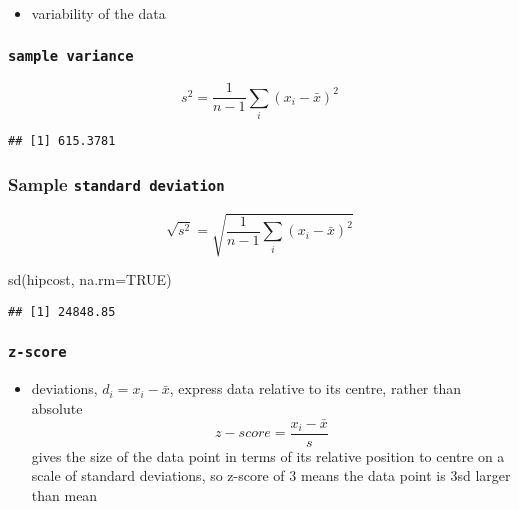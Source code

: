 \documentclass[
]{book}
\newenvironment{Shaded}{\begin{snugshade}}{\end{snugshade}}
\newcommand{\AttributeTok}[1]{\textcolor[rgb]{0.77,0.63,0.00}{#1}}
\newcommand{\ConstantTok}[1]{\textcolor[rgb]{0.00,0.00,0.00}{#1}}
\newcommand{\FunctionTok}[1]{\textcolor[rgb]{0.00,0.00,0.00}{#1}}
\newcommand{\NormalTok}[1]{#1}
\newcommand{\SpecialCharTok}[1]{\textcolor[rgb]{0.00,0.00,0.00}{#1}}
\providecommand{\tightlist}{%
  \setlength{\itemsep}{0pt}\setlength{\parskip}{0pt}}
\theoremstyle{definition}
\theoremstyle{definition}
\theoremstyle{definition}
\theoremstyle{definition}
\theoremstyle{remark}
\begin{document}
\begin{itemize}
\tightlist
\item
  variability of the data
\end{itemize}

\hypertarget{sample-variance}{%
\subsubsection{\texorpdfstring{\texttt{sample\ variance}}{sample variance}}\label{sample-variance}}

\[
s^2=\frac{1}{n-1}\sum_{i}(x_i-\bar{x})^2
\]

\begin{Shaded}
\end{Shaded}

\begin{verbatim}
## [1] 615.3781
\end{verbatim}

\hypertarget{sample-standard-deviation}{%
\subsubsection{\texorpdfstring{Sample \texttt{standard\ deviation}}{Sample standard deviation}}\label{sample-standard-deviation}}

\[
\sqrt{s^2}=\sqrt{\frac{1}{n-1}\sum_{i}(x_i-\bar{x})^2}
\]

\begin{Shaded}
\begin{Highlighting}[]
\FunctionTok{sd}\NormalTok{(hipcost, }\AttributeTok{na.rm=}\ConstantTok{TRUE}\NormalTok{)}
\end{Highlighting}
\end{Shaded}

\begin{verbatim}
## [1] 24848.85
\end{verbatim}

\hypertarget{z-score}{%
\subsubsection{\texorpdfstring{\texttt{z-score}}{z-score}}\label{z-score}}

\begin{itemize}
\tightlist
\item
  deviations, \(d_i=x_i-\bar{x}\), express data relative to its centre, rather than absolute
  \[
  z-score=\frac{x_i-\bar{x}}{s}
  \]
  gives the size of the data point in terms of its relative position to centre on a scale of standard deviations, so z-score of 3 means the data point is 3sd larger than mean
\end{itemize}
\end{document}
